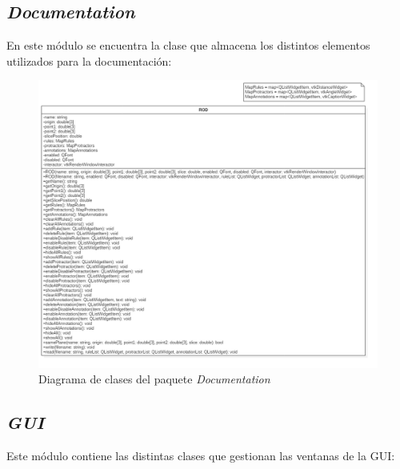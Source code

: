 \subsection{\textit{Documentation}}

En este módulo se encuentra la clase que almacena los distintos elementos utilizados para la documentación:

\begin{figure}[H]
	\centering
	\includegraphics[width=12cm]{imagenes/diseno/documentation}
	\caption{Diagrama de clases del paquete \textit{Documentation}}
	\label{fig:diseno/documentation}
\end{figure}

\subsection{\textit{GUI}}

Este módulo contiene las distintas clases que gestionan las ventanas de la GUI:


